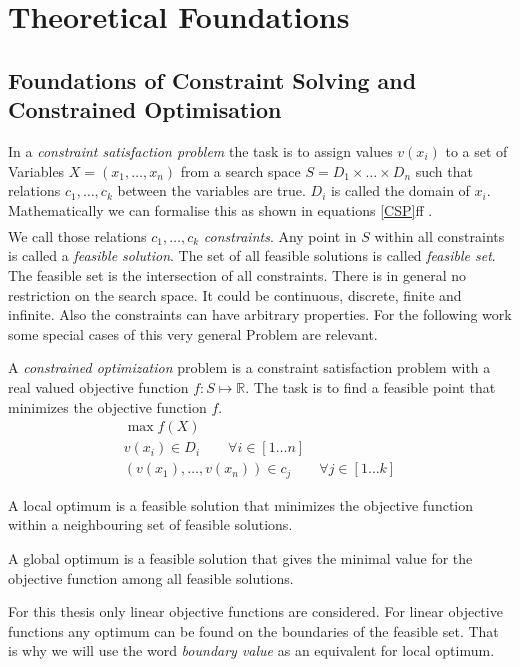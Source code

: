 \chapter{Theoretical Foundations}
\section{Foundations of Constraint Solving and Constrained Optimisation}
In a \emph{constraint satisfaction problem} the task is to assign values $v(x_i)$ to a set of Variables $X = (x_1, \dots , x_n) $ from a search space $S=D_1\times \dots \times D_n$ such that relations $c_1,\dots,c_k$ between the variables are true. $D_i$ is called the domain of $x_i$. Mathematically we can formalise this as shown in equations \ref{CSP}ff \cite{Eiben97constraintsatisfaction}\cite{wiki:CSP}.
\begin{eqnarray} 
\label{CSP}
\end{eqnarray} 
We call those relations $c_1,\dots,c_k$ \emph{constraints}. Any point in $S$ within all constraints is called a \emph{feasible solution}. The set of all feasible solutions is called \emph{feasible set}. The feasible set is the intersection of all constraints.
There is in general no restriction on the search space. It could be continuous, discrete, finite and infinite. Also the constraints can have arbitrary properties. For the following work some special cases of this very general Problem are relevant.

A \emph{constrained optimization} problem is a constraint satisfaction problem with a real valued objective function $f:S\mapsto \mathbb{R}$. The task is to find a feasible point that minimizes the objective function $f$.
\begin{eqnarray}
\max f(X)\\
v(x_i) \in D_i \qquad\forall i \in \left[ 1 \dots n \right] \\
(v(x_1),\dots , v(x_n)) \in c_j\qquad\forall j \in \left[1 \dots k\right]
\end{eqnarray}
\begin{definition}
A local optimum is a feasible solution that minimizes the objective function within a neighbouring set of feasible solutions.
\end{definition}
\begin{definition}
A global optimum is a feasible solution that gives the minimal value for the objective function among all feasible solutions.
\end{definition}
For this thesis only linear objective functions are considered. For linear objective functions any optimum can be found on the boundaries of the feasible set. That is why we will use the word \emph{boundary value} as an equivalent for local optimum.

